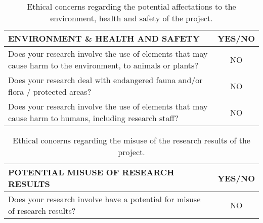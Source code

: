 \begin{table}[H]
	\centering
	\begin{tabular}[H]{ p{12.6cm} c }
		
		\toprule[2pt]
		
		\textbf{ENVIRONMENT \& HEALTH AND SAFETY} & \textbf{YES/NO} \\
		
		\midrule[1.5pt]
		
		Does your research involve the use of elements that may cause harm to the environment, to animals or plants?\vspace{0.2cm} & NO\\
		
		Does your research deal with endangered fauna and/or flora / protected areas?\vspace{0.2cm} & NO \\
		
		Does your research involve the use of elements that may cause harm to humans, including research staff?\vspace{0.1cm} & NO \\
		
		\bottomrule[2pt]
			
	\end{tabular}
	\caption[Ethics - Environment, health and safety]{Ethical concerns regarding the potential affectations to the environment, health and safety of the project.}
	\label{Ethics_Environment}
\end{table}



\begin{table}[H]
	\centering
	\begin{tabular}[H]{ p{12.6cm} c }
		
		\toprule[2pt]
		
		\textbf{POTENTIAL MISUSE OF RESEARCH RESULTS} & \textbf{YES/NO} \\
		
		\midrule[1.5pt]
		
		Does your research involve have a potential for misuse of research results?\vspace{0.1cm} & NO \\
		
		\bottomrule[2pt]
		
	\end{tabular}
	\caption[Ethics - Misuse of results]{Ethical concerns regarding the misuse of the research results of the project.}
	\label{Ethics_Misuse}
\end{table}

